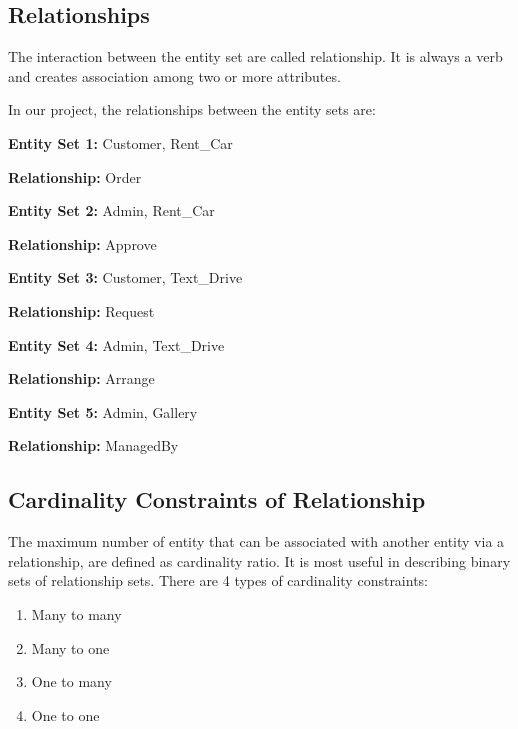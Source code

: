 \noindent 

\noindent 

\noindent 
\newpage

\subsection{ Relationships}

\noindent The interaction between the entity set are called relationship. It is always a verb and creates association among two or more attributes.

\noindent In our project, the relationships between the entity sets are:

\noindent \textbf{Entity Set 1:} Customer, Rent\_Car

\noindent \textbf{Relationship:} Order

\noindent 

\noindent \textbf{Entity Set 2:} Admin, Rent\_Car

\noindent \textbf{Relationship:} Approve

\noindent 

\noindent \textbf{Entity Set 3:} Customer, Text\_Drive

\noindent \textbf{Relationship:} Request

\noindent 

\noindent \textbf{Entity Set 4:} Admin, Text\_Drive

\noindent \textbf{Relationship:} Arrange

\noindent \textbf{Entity Set 5:} Admin, Gallery

\noindent \textbf{Relationship:} ManagedBy

\noindent 

\noindent 
\subsection{ Cardinality Constraints of Relationship}

\noindent The maximum number of entity that can be associated with another entity via a relationship, are defined as cardinality ratio. It is most useful in describing binary sets of relationship sets. There are 4 types of cardinality constraints:

\begin{enumerate}
\item  Many to many

\item  Many to one

\item  One to many

\item  One to one
\end{enumerate}


